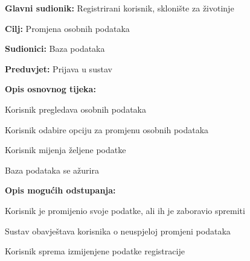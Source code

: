 					\noindent {}
					\begin{packed_item}
	
						\item \textbf{Glavni sudionik:} Registrirani korisnik, sklonište za životinje
						\item  \textbf{Cilj:} Promjena osobnih podataka
						\item  \textbf{Sudionici:} Baza podataka
						\item  \textbf{Preduvjet:} Prijava u sustav
						\item  \textbf{Opis osnovnog tijeka:}
						
						\item[] \begin{packed_enum}
	
							\item Korisnik pregledava osobnih podataka
							\item Korisnik odabire opciju za promjenu osobnih podataka
							\item Korisnik mijenja željene podatke
							\item Baza podataka se ažurira
						\end{packed_enum}
						
						\item \textbf{Opis mogućih odstupanja:} 
						
						
						\item[] \begin{packed_item}
	
							\item[3.a] Korisnik je promijenio svoje podatke, ali ih je zaboravio spremiti
							\item[] \begin{packed_enum}
								
								\item Sustav obavještava korisnika o neuspjeloj promjeni podataka
								\item Korisnik sprema izmijenjene podatke registracije
								
							\end{packed_enum}
					\end{packed_item}
					\end{packed_item}
					
